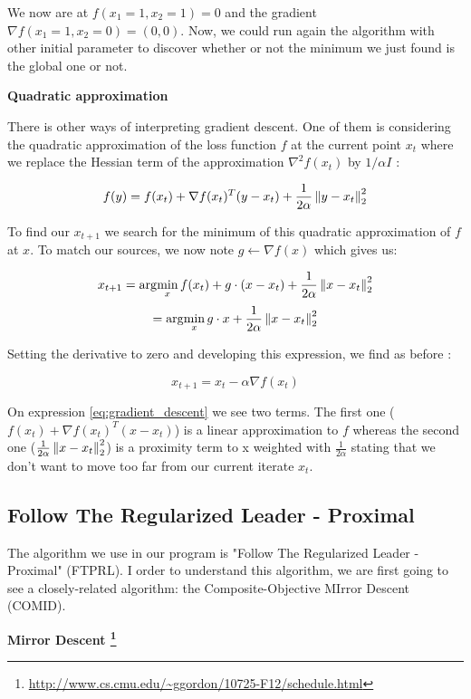 		We now are at $f(x_1=1,x_2=1) = 0$ and the gradient $ \nabla f(x_1=1,x_2=0) = (0,0)$. 
		Now, we could run again the algorithm with other initial parameter to discover whether or not the minimum we just found is the global one or not.

		\vspace{\baselineskip}
		\textbf{Quadratic approximation}

		There is other ways of interpreting gradient descent. One of them is considering the quadratic approximation of the loss function $f$ at the current point $x_t$ where we replace the Hessian term of the approximation $\nabla^2 f(x_t)$ by $1/\alpha I$ :

		$$ f(y) = f(x_t)+\nabla f(x_t)^T(y-x_t) + \frac{1}{2\alpha}\left\lVert y-x_t\right\rVert_2^2  $$

		To find our $x_{t+1}$ we search for the minimum of this quadratic approximation of $f$ at $x$. To match our sources, we now note $g \leftarrow \nabla f(x)$ which gives us:

		\begin{equation}
			x_{t+1} = \arg\!\min_x f(x_t)+ g \cdot (x-x_t) + \frac{1}{2\alpha}\left\lVert x-x_t\right\rVert_2^2
			\label{eq:gradient_descent}
		\end{equation}
		$$  = \arg\!\min_x g \cdot x + \frac{1}{2\alpha}\left\lVert x-x_t\right\rVert_2^2 $$

		Setting the derivative to zero and developing this expression, we find as before : 

		$$ x_{t+1} = x_t - \alpha \nabla f(x_t) $$

		On expression \ref{eq:gradient_descent} we see two terms. The first one ($f(x_t)+\nabla f(x_t)^T(x-x_t)$) is a linear approximation to $f$ whereas the second one ($\frac{1}{2\alpha}\left\lVert x-x_t\right\rVert_2^2 $) is a proximity term to x weighted with $\frac{1}{2\alpha}$ stating that we don't want to move too far from our current iterate $x_t$.
		


	\subsection{Follow The Regularized Leader - Proximal}

		The algorithm we use in our program is "Follow The Regularized Leader - Proximal" (FTPRL). I order to understand this algorithm, we are first going to see a closely-related algorithm: the Composite-Objective MIrror Descent (COMID). 

		\vspace{\baselineskip}
		\textbf{Mirror Descent \footnote{\url{http://www.cs.cmu.edu/~ggordon/10725-F12/schedule.html}}}

